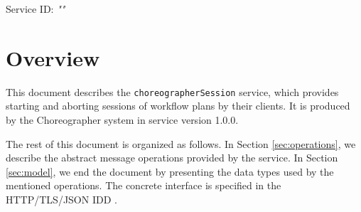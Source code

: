 \documentclass[a4paper]{arrowhead}
\begin{document}
\sloppy

\ArrowheadSetup

\begin{center}
  \vspace*{1cm}
  \huge{\arrowtitle}

  \vspace*{0.2cm}
  \LARGE{\arrowtype}
  \vspace*{1cm}

  \Large{Service ID: \textit{"\arrowid"}}

  \vspace*{\fill}


  \vspace*{1cm}
  \vspace*{\fill}

  \begin{abstract}
    This document describes the \texttt{choreographer\allowbreak{}Session} service, version 1.0.0, produced by the Choreographer support system of Arrowhead 5.2.2.
  \end{abstract}

  \vspace*{1cm}
\end{center}

\newpage

\tableofcontents
\newpage

\section{Overview}
\label{sec:overview}

This document describes the \texttt{choreographer\allowbreak{}Session} service, which provides starting and aborting sessions of workflow plans by their clients.
It is produced by the Choreographer system \cite{cho-sysd} in service version 1.0.0.

The rest of this document is organized as follows.
In Section \ref{sec:operations}, we describe the abstract message operations provided by the service.
In Section \ref{sec:model}, we end the document by presenting the data types used by the mentioned operations.
The concrete interface is specified in the HTTP/TLS/JSON IDD \cite{cho-choreographerSession-http-idd}.
\end{document}

